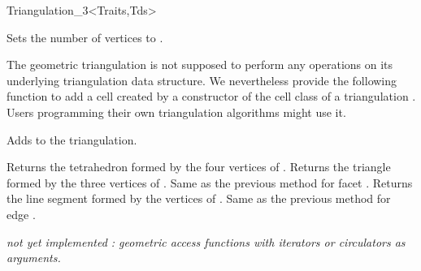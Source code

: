 \begin{ccClassTemplate}{Triangulation_3<Traits,Tds>}
\begin{ccAdvanced}
{Sets the number of vertices to .}

\ccModifiers
The geometric triangulation is not supposed to perform any operations
on its underlying triangulation data structure. We nevertheless
provide the following function to add a cell created by a constructor
of the cell class of a triangulation
. Users programming their own
triangulation algorithms might use it.

{Adds  to the triangulation.
}
\end{ccAdvanced}


{Returns the tetrahedron formed by the four vertices of .
}
\ccGlue
{}
{Returns the triangle formed by the three vertices of . 
}
\ccGlue
{}
{Same as the previous method for facet .
}
\ccGlue
{}
{Returns the line segment formed by the vertices of .
}
\ccGlue
{}
{Same as the previous method for edge .
}

 \textit{not yet implemented : geometric access functions with iterators or
circulators as arguments.}



\end{ccClassTemplate}
